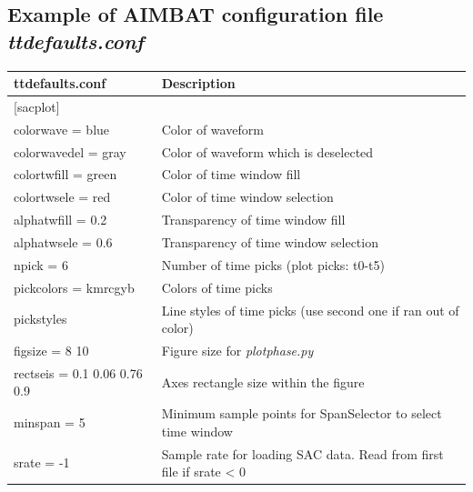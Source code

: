 \documentclass[letterpaper,10pt,english]{sphinxmanual}
\begin{document}
\subsection{Example of AIMBAT configuration file \emph{ttdefaults.conf}}
\label{docfiles/parameterConfiguration:example-of-aimbat-configuration-file-ttdefaults-conf}
\begin{tabulary}{\linewidth}{|L|L|}
\hline
\textsf{\relax 
ttdefaults.conf
} & \textsf{\relax 
Description
}\\
\hline
{[}sacplot{]}
 & \\

colorwave = blue
 & 
Color of waveform
\\

colorwavedel = gray
 & 
Color of waveform which is deselected
\\

colortwfill = green
 & 
Color of time window fill
\\

colortwsele = red
 & 
Color of time window selection
\\

alphatwfill = 0.2
 & 
Transparency of time window fill
\\

alphatwsele = 0.6
 & 
Transparency of time window selection
\\

npick = 6
 & 
Number of time picks (plot picks: t0-t5)
\\

pickcolors = kmrcgyb
 & 
Colors of time picks
\\

pickstyles
 & 
Line styles of time picks (use second one if ran out of color)
\\

figsize = 8 10
 & 
Figure size for \emph{plotphase.py}
\\

rectseis = 0.1 0.06 0.76 0.9
 & 
Axes rectangle size within the figure
\\

minspan = 5
 & 
Minimum sample points for SpanSelector to select time window
\\

srate = -1
 & 
Sample rate for loading SAC data.
Read from first file if srate \textless{} 0
\\
\hline\end{tabulary}
\end{document}
